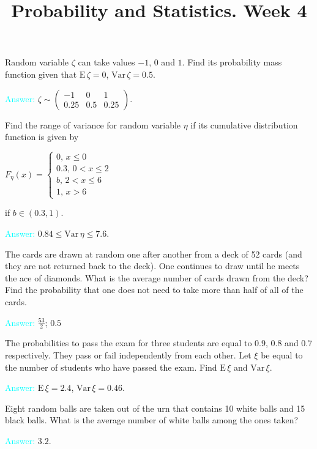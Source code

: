 \documentclass[14pt]{exam}
\title{Probability and Statistics. Week 4}
\date{}
\def\Var{{\textrm{Var}}\,}
\def\E{{\textrm{E}}\,}
\begin{document}
	\maketitle
	
	
	\begin{questions}
		\question
		Random variable $\zeta$ can take values $-1$, $0$ and $1$. Find its probability mass function given that $\E\zeta = 0$, $\Var \zeta = 0.5$.
		
		\textcolor{cyan}{Answer:} $\zeta \sim \begin{pmatrix}
			-1 & 0 & 1\\
			0.25 & 0.5 & 0.25
		\end{pmatrix}$.
		
		\question
		Find the range of variance for random variable $\eta$ if its cumulative distribution function is given by
		
		$
			F_\eta(x) = \begin{cases}
				0,\, x \leq 0\\
				0.3,\, 0 < x \leq 2\\
				b,\, 2 < x \leq 6\\
				1,\, x > 6
			\end{cases}
		$
		
		if $b \in (0.3, 1)$.
		
		\textcolor{cyan}{Answer:} $0.84 \leq \Var \eta \leq 7.6$.
		
		\question
		The cards are drawn at random one after another from a deck of 52 cards (and they are not returned back to the deck). One continues to draw until he meets the ace of diamonds. What is the average number of cards drawn from the deck? Find the probability that one does not need to take more than half of all of the cards.
		
		\textcolor{cyan}{Answer:} $\frac{53}{2}$; $0.5$
		
		\question
		The probabilities to pass the exam for three students are equal to $0.9$, $0.8$ and $0.7$ respectively. They pass or fail independently from each other. Let $\xi$ be equal to the number of students who have passed the exam. Find $\E\xi$ and $\Var\xi$.
		
		\textcolor{cyan}{Answer:} $\E\xi = 2.4$, $\Var\xi = 0.46$.
		
		\question
		Eight random balls are taken out of the urn that contains 10 white balls and 15 black balls. What is the average number of white balls among the ones taken?
		
		\textcolor{cyan}{Answer:} $3.2$.
		

\end{questions}
\end{document}
